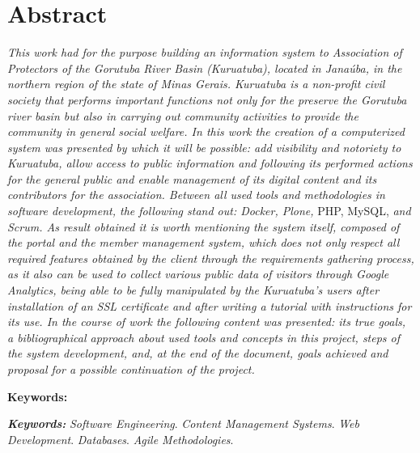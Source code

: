 \chapter*{Abstract}
\vspace{0.4cm}
\noindent \textit{This work had for the purpose building an information system to Association of Protectors of the Gorutuba River Basin (Kuruatuba), located in Janaúba, in the northern region of the state of Minas Gerais. 
Kuruatuba is a non-profit civil society that performs important functions not only for the preserve the Gorutuba river basin but also in carrying out community activities to provide the community in general social welfare.
In this work the creation of a computerized system was presented by which it will be possible: add visibility and notoriety to Kuruatuba, allow access to public information and following its performed actions for the general public and enable management of its digital content and its contributors for the association.
Between all used tools and methodologies in software development, the following stand out: Docker, Plone,} PHP, MySQL, \textit{and Scrum.
As result obtained it is worth mentioning the system itself, composed of the portal and the member management system, which does not only respect all required features obtained by the client through the requirements gathering process, as it also can be used to collect various public data of visitors through Google Analytics, being able to be fully manipulated by the Kuruatuba's users after installation of an SSL certificate and after writing a tutorial with instructions for its use.
In the course of work the following content was presented: its true goals, a bibliographical approach about used tools and concepts in this project, steps of the system development, and, at the end of the document, goals achieved and proposal for a possible continuation of the project.}

\begin{labeling}{\textbf{Keywords:}}
\item[\textit{\textbf{Keywords:}}] 
\textit{Software Engineering}.
\textit{Content Management Systems}.
\textit{Web Development}.
\textit{Databases}.
\textit{Agile Methodologies}.
\end{labeling}
